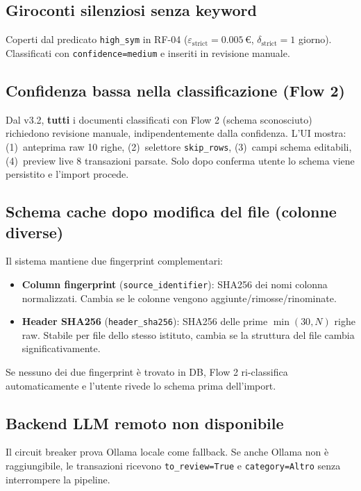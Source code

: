 \documentclass[11pt, a4paper]{article}
\begin{document}
\subsection{Giroconti silenziosi senza keyword}

Coperti dal predicato \texttt{high\_sym} in RF-04
($\varepsilon_{\text{strict}} = 0.005$\,\euro, $\delta_{\text{strict}} = 1$ giorno).
Classificati con \texttt{confidence=medium} e inseriti in revisione manuale.

\subsection{Confidenza bassa nella classificazione (Flow 2)}

Dal v3.2, \textbf{tutti} i documenti classificati con Flow 2 (schema sconosciuto)
richiedono revisione manuale, indipendentemente dalla confidenza.
L'UI mostra: (1)~anteprima raw 10 righe, (2)~selettore \texttt{skip\_rows},
(3)~campi schema editabili, (4)~preview live 8 transazioni parsate.
Solo dopo conferma utente lo schema viene persistito e l'import procede.

\subsection{Schema cache dopo modifica del file (colonne diverse)}

Il sistema mantiene due fingerprint complementari:
\begin{itemize}
  \item \textbf{Column fingerprint} (\texttt{source\_identifier}): SHA256 dei nomi colonna normalizzati. Cambia se le colonne vengono aggiunte/rimosse/rinominate.
  \item \textbf{Header SHA256} (\texttt{header\_sha256}): SHA256 delle prime $\min(30,N)$ righe raw. Stabile per file dello stesso istituto, cambia se la struttura del file cambia significativamente.
\end{itemize}
Se nessuno dei due fingerprint è trovato in DB, Flow 2 ri-classifica automaticamente
e l'utente rivede lo schema prima dell'import.

\subsection{Backend LLM remoto non disponibile}

Il circuit breaker prova Ollama locale come fallback. Se anche Ollama non è
raggiungibile, le transazioni ricevono \texttt{to\_review=True} e
\texttt{category=Altro} senza interrompere la pipeline.
\end{document}
